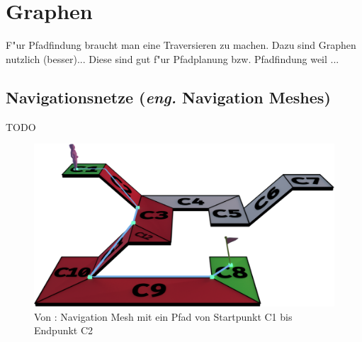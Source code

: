 \chapter{Graphen}

F"ur Pfadfindung braucht man eine Traversieren zu machen. Dazu sind Graphen nutzlich (besser)...
Diese sind gut f"ur Pfadplanung bzw. Pfadfindung weil ...

\section{Navigationsnetze (\textit{eng.} Navigation Meshes)}
TODO

\begin{figure} %
	\centering
	\includegraphics[width=\textwidth]{images/mesh_with_path.png}
	\caption{Von \cite{Mesh:18}: Navigation Mesh mit ein Pfad von Startpunkt C1 bis Endpunkt C2}
	\label{sec1a}
\end{figure}



